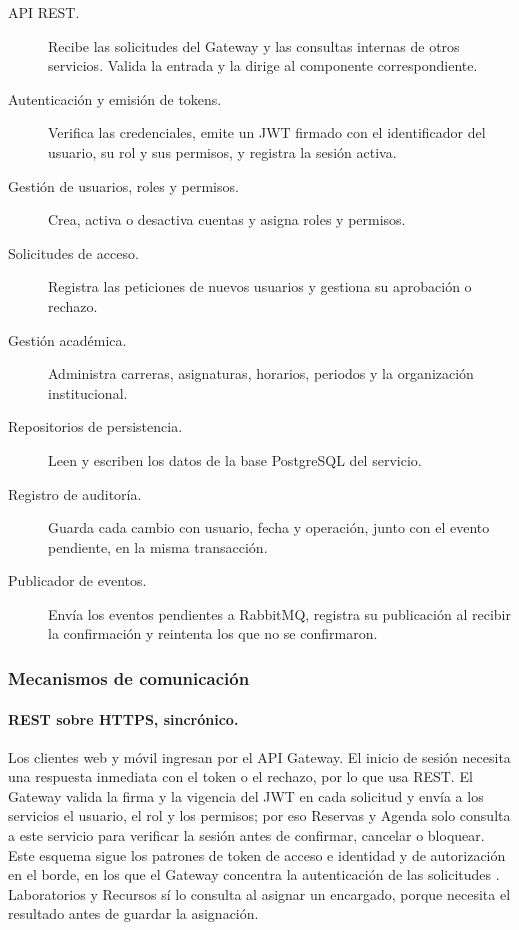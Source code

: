 \begin{description}
    \item[API REST.] Recibe las solicitudes del Gateway y las consultas
    internas de otros servicios. Valida la entrada y la dirige al componente
    correspondiente.
    \item[Autenticación y emisión de tokens.] Verifica las credenciales,
    emite un JWT firmado con el identificador del usuario, su rol y sus
    permisos, y registra la sesión activa.
    \item[Gestión de usuarios, roles y permisos.] Crea, activa o desactiva
    cuentas y asigna roles y permisos.
    \item[Solicitudes de acceso.] Registra las peticiones de nuevos usuarios
    y gestiona su aprobación o rechazo.
    \item[Gestión académica.] Administra carreras, asignaturas, horarios,
    periodos y la organización institucional.
    \item[Repositorios de persistencia.] Leen y escriben los datos de la
    base PostgreSQL del servicio.
    \item[Registro de auditoría.] Guarda cada cambio con usuario, fecha y
    operación, junto con el evento pendiente, en la misma transacción.
    \item[Publicador de eventos.] Envía los eventos pendientes a RabbitMQ,
    registra su publicación al recibir la confirmación y reintenta los que
    no se confirmaron.
\end{description}

\subsubsection{Mecanismos de comunicación}

\paragraph{REST sobre HTTPS, sincrónico.}
Los clientes web y móvil ingresan por el API Gateway. El inicio de sesión
necesita una respuesta inmediata con el token o el rechazo, por lo que usa
REST. El Gateway valida la firma y la vigencia del JWT en cada solicitud y
envía a los servicios el usuario, el rol y los permisos; por eso Reservas y
Agenda solo consulta a este servicio para verificar la sesión antes de
confirmar, cancelar o bloquear. Este esquema sigue los
patrones de token de acceso e identidad y de autorización en el borde, en los
que el Gateway concentra la autenticación de las solicitudes
\cite{waseem2022decision,haindl2024interservice}. Laboratorios y Recursos
sí lo consulta al asignar un encargado, porque necesita el resultado antes de
guardar la asignación.


